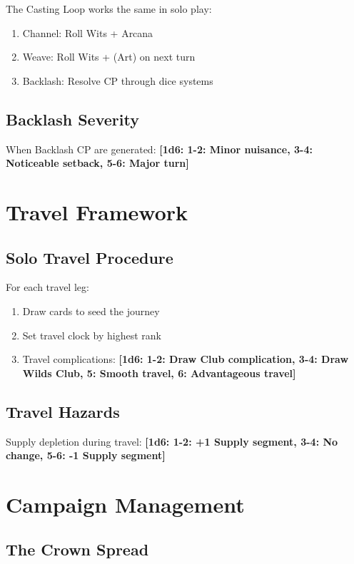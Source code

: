 \documentclass[11pt]{article}
\newcommand{\dice}[1]{\textbf{[1d6: #1]}}
\begin{document}
The Casting Loop works the same in solo play:
\begin{enumerate}
    \item Channel: Roll Wits + Arcana
    \item Weave: Roll Wits + (Art) on next turn
    \item Backlash: Resolve CP through dice systems
\end{enumerate}

\subsection{Backlash Severity}

When Backlash CP are generated:
\dice{1-2: Minor nuisance, 3-4: Noticeable setback, 5-6: Major turn}

\section{Travel Framework}

\subsection{Solo Travel Procedure}

For each travel leg:
\begin{enumerate}
    \item Draw cards to seed the journey
    \item Set travel clock by highest rank
    \item Travel complications:
    \dice{1-2: Draw Club complication, 3-4: Draw Wilds Club, 5: Smooth travel, 6: Advantageous travel}
\end{enumerate}

\subsection{Travel Hazards}

Supply depletion during travel:
\dice{1-2: +1 Supply segment, 3-4: No change, 5-6: -1 Supply segment}

\section{Campaign Management}

\subsection{The Crown Spread}
\end{document}
